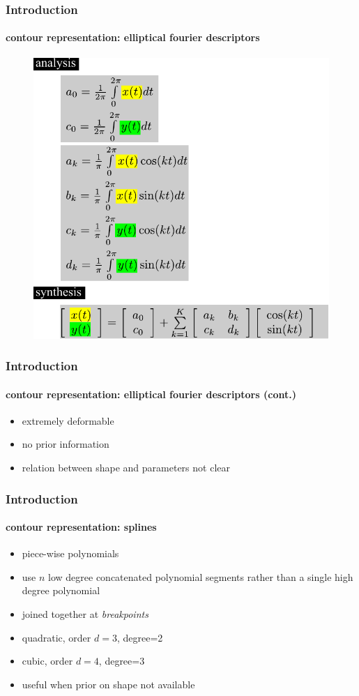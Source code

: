 \begin{frame}
\frametitle{Introduction}
\framesubtitle{contour representation: elliptical fourier descriptors}
\mypagenum
	\begin{figure}
		\includegraphics[height=0.8\textheight]{figs/theory_curves_ellipticalFourier.pdf}
	\end{figure}
\end{frame}



\begin{frame}
\frametitle{Introduction}
\framesubtitle{contour representation: elliptical fourier descriptors (cont.)}
\mypagenum
	\begin{itemize}
		\item extremely deformable
		\item no prior information
		\item relation between shape and parameters not clear
	\end{itemize}
\end{frame}


\begin{frame}
\frametitle{Introduction}
\framesubtitle{contour representation: splines}
\logoCSIPCPL\mypagenum
	\begin{itemize}
		\item piece-wise polynomials
		\item use $n$ low degree concatenated polynomial segments rather than a single high degree polynomial
		\item joined together at \emph{breakpoints}
		\item quadratic, order $d=3$, degree=2
		\item cubic, order $d=4$, degree=3
		\item useful when prior on shape not available
	\end{itemize}
\end{frame}



